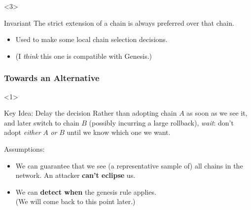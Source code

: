 \documentclass[usenames,dvipsnames,t]{beamer}
\begin{document}
\begin{frame}

\begin{onlyenv}<3>

\begin{alertblock}{Invariant}
The strict extension of a chain is always preferred over that chain.
\end{alertblock}

\begin{itemize}
\item Used to make some local chain selection decisions.
\item (I \emph{think} this one is compatible with Genesis.)
\end{itemize}

\end{onlyenv}

\end{frame}


\begin{frame}
\frametitle{Towards an Alternative}

\begin{onlyenv}<1>

\begin{alertblock}{Key Idea: Delay the decision}
Rather than adopting chain $A$ as soon as we see it,
and later switch to chain $B$ (possibly incurring a large rollback), \emph{wait}:
don't adopt \emph{either} $A$ \emph{or} $B$ until we know which one we want.
\end{alertblock}

Assumptions:

\begin{itemize}
\item We can guarantee that we see (a representative sample of) all chains
in the network. An attacker \textbf{can't eclipse} us.
\item We can \textbf{detect when} the genesis rule applies. \\
(We will come back to this point later.)
\end{itemize}

\end{onlyenv}

\end{frame}

\end{document}
